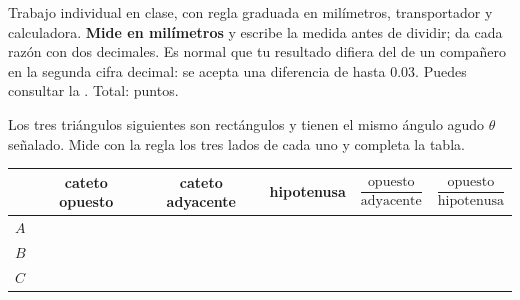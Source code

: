 \documentclass[11pt]{article}
\begin{document}
\encabezado

\begin{instrucciones}
Trabajo individual en clase, con regla graduada en milímetros, transportador y
calculadora. \textbf{Mide en milímetros} y escribe la medida antes de dividir; da cada
razón con dos decimales. Es normal que tu resultado difiera del de un compañero en la
segunda cifra decimal: se acepta una diferencia de hasta $\num{0,03}$. Puedes consultar
la . Total: \totalpuntos{} puntos.
\end{instrucciones}

\begin{preguntas}

\pregunta[2] Los tres triángulos siguientes son rectángulos y tienen el mismo ángulo
agudo $\theta$ señalado. Mide con la regla los tres lados de cada uno y completa la tabla.

\begin{center}
\end{center}

\begin{center}
{\renewcommand{\arraystretch}{1.6}
\begin{tabular}{@{}l c c c c c@{}}
  \toprule
  & \textbf{cateto opuesto} & \textbf{cateto adyacente} & \textbf{hipotenusa}
  & $\dfrac{\text{opuesto}}{\text{adyacente}}$ & $\dfrac{\text{opuesto}}{\text{hipotenusa}}$\\
  \midrule
  $A$ & \hspace{2.2cm} & \hspace{2.2cm} & \hspace{2.2cm} & \hspace{2cm} & \hspace{2cm}\\
  $B$ & & & & & \\
  $C$ & & & & & \\
  \bottomrule
\end{tabular}}
\end{center}


\end{preguntas}
\end{document}

